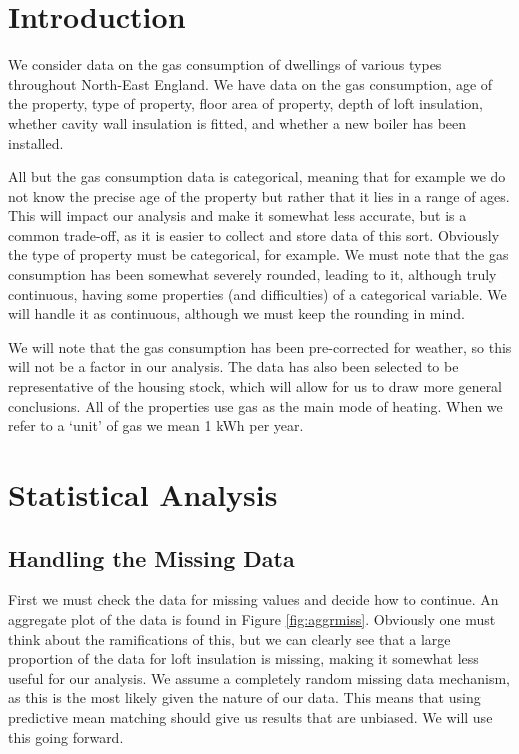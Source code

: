 \documentclass[9pt]{extarticle}
\begin{document}
\section{Introduction}

We consider data on the gas consumption of dwellings of various types throughout North-East England. We have data on the gas consumption, age of the property, type of property, floor area of property, depth of loft insulation, whether cavity wall insulation is fitted, and whether a new boiler has been installed.

All but the gas consumption data is categorical, meaning that for example we do not know the precise age of the property but rather that it lies in a range of ages. This will impact our analysis and make it somewhat less accurate, but is a common trade-off, as it is easier to collect and store data of this sort. Obviously the type of property must be categorical, for example. We must note that the gas consumption has been somewhat severely rounded, leading to it, although truly continuous, having some properties (and difficulties) of a categorical variable. We will handle it as continuous, although we must keep the rounding in mind.

We will note that the gas consumption has been pre-corrected for weather, so this will not be a factor in our analysis. The data has also been selected to be representative of the housing stock, which will allow for us to draw more general conclusions. All of the properties use gas as the main mode of heating. When we refer to a `unit' of gas we mean 1 kWh per year.

\section{Statistical Analysis}

\subsection{Handling the Missing Data}

First we must check the data for missing values and decide how to continue. An aggregate plot of the data is found in Figure \ref{fig:aggrmiss}. Obviously one must think about the ramifications of this, but we can clearly see that a large proportion of the data for loft insulation is missing, making it somewhat less useful for our analysis. We assume a completely random missing data mechanism, as this is the most likely given the nature of our data. This means that using predictive mean matching should give us results that are unbiased. We will use this going forward.
\end{document}
